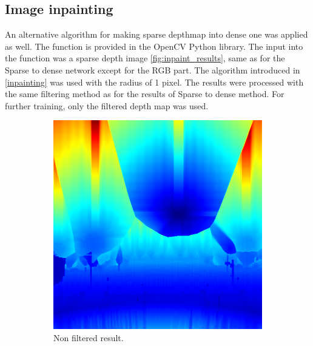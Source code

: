 \documentclass[twoside]{ctuthesis}
\theoremstyle{plain}
\theoremstyle{definition}
\theoremstyle{note}
\begin{document}
\subsection{Image inpainting}
An alternative algorithm for making sparse depthmap into dense one was applied as well. The function is provided in the OpenCV Python library. The input into the function was a sparse depth image \ref{fig:inpaint_results}, same as for the Sparse to dense network except for the RGB part. The algorithm introduced in \ref{inpainting} was used with the radius of 1 pixel. The results were processed with the same filtering method as for the results of Sparse to dense method. For further training, only the filtered depth map was used.
\begin{figure}
	\centering
	\begin{subfigure}[b]{0.3\textwidth}
		\centering
		\includegraphics[width=\textwidth]{raw_inpaint.png}
		\caption{Non filtered result.}
	\end{subfigure}
	\hfill
	\begin{subfigure}[b]{0.3\textwidth}
		\centering

\end{subfigure}
\end{figure}
\end{document}
